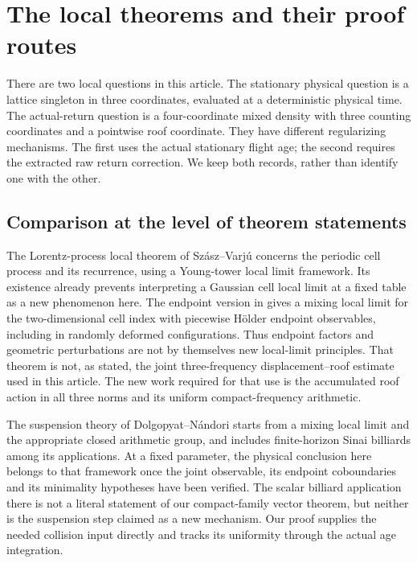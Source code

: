 \section{The local theorems and their proof routes}
\label{sec:v35-literature-routes}
There are two local questions in this article. The stationary physical
question is a lattice singleton in three coordinates, evaluated at a
deterministic physical time. The actual-return question is a
four-coordinate mixed density with three counting coordinates and a
pointwise roof coordinate. They have different regularizing mechanisms.
The first uses the actual stationary flight age; the second requires
the extracted raw return correction. We keep both records, rather than
identify one with the other.

\subsection{Comparison at the level of theorem statements}
The Lorentz-process local theorem of Sz\'asz--Varj\'u \cite{SV} concerns
the periodic cell process and its recurrence, using a Young-tower local
limit framework. Its existence already prevents interpreting a Gaussian
cell local limit at a fixed table as a new phenomenon here. The endpoint
version in \cite[Theorem 2.2 and Remark 2.3]{DPZ} gives a mixing local
limit for the two-dimensional cell index with piecewise H\"older
endpoint observables, including in randomly deformed configurations.
Thus endpoint factors and geometric perturbations are not by themselves
new local-limit principles. That theorem is not, as stated, the joint
three-frequency displacement--roof estimate used in this article.
The new work required for that use is the accumulated roof action in
all three norms and its uniform compact-frequency arithmetic.

The suspension theory of Dolgopyat--N\'andori
\cite[Definition 2.2, Theorem 3.7 and Proposition 6.3]{DN} starts from
a mixing local limit and the appropriate closed arithmetic group, and
includes finite-horizon Sinai billiards among its applications. At a
fixed parameter, the physical conclusion here belongs to that
framework once the joint observable, its endpoint coboundaries and
its minimality hypotheses have been verified. The scalar billiard
application there is not a literal statement of our compact-family
vector theorem, but neither is the suspension step claimed as a new
mechanism. Our proof supplies the needed collision input directly and
tracks its uniformity through the actual age integration.

